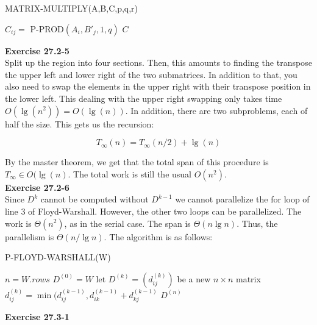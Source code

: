 \documentclass{article}
\begin{document}
\begin{algorithm}
\caption{MATRIX-MULTIPLY(A,B,C,p,q,r)}
\begin{algorithmic}[1]
		\State $C_{ij} = $ P-PROD$(A_i, B'_j, 1,q)$
	\EndParFor
\EndParFor
\State \Return $C$
\end{algorithmic}
\end{algorithm}


\noindent\textbf{Exercise 27.2-5}\\

Split up the region into four sections. Then, this amounts to finding the transpose the upper left and lower right of the two submatrices. In addition to that, you also need to swap the elements in the upper right with their transpose position in the lower left. This dealing with the upper right swapping only takes time $O(\lg(n^2)) = O(\lg(n))$. In addition, there are two subproblems, each of half the size. This gets us the recursion:

\[
T_{\infty}(n) = T_{\infty}(n/2) + \lg(n)
\]

By the master theorem, we get that the total span of this procedure is $T_{\infty} \in O(\lg(n)$. The total work is still the usual $O(n^2)$.\\

\noindent\textbf{Exercise 27.2-6}\\

Since $D^k$ cannot be computed without $D^{k-1}$ we cannot parallelize the for loop of line 3 of Floyd-Warshall.  However, the other two loops can be parallelized.  The work is $\Theta(n^2)$, as in the serial case.  The span is $\Theta(n \lg n)$.  Thus, the parallelism is $\Theta(n/\lg n)$.  The algorithm is as follows:\\

\begin{algorithm}
\caption{P-FLOYD-WARSHALL(W)}
\begin{algorithmic}[1]
\State $n = W.rows$
\State $D^{(0)} = W$
	\State let $D^{(k)} = (d_{ij}^{(k)})$ be a new $n \times n$ matrix
			\State $d_{ij}^{(k)} = \min (d_{ij}^{(k-1)},d_{ik}^{(k-1)} + d_{kj}^{(k-1)} $
		\EndParFor
	\EndParFor
\EndFor
\State \Return $D^{(n)}$
\end{algorithmic}
\end{algorithm}


\noindent\textbf{Exercise 27.3-1}\\
\end{document}
